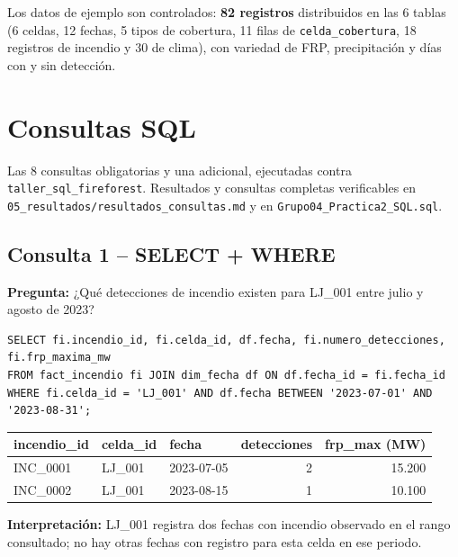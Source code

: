 \documentclass[11pt,a4paper]{article}
\begin{document}
Los datos de ejemplo son controlados: \textbf{82 registros} distribuidos en las 6 tablas (6
celdas, 12 fechas, 5 tipos de cobertura, 11 filas de \texttt{celda\_cobertura}, 18 registros de
incendio y 30 de clima), con variedad de FRP, precipitaci\'on y d\'ias con y sin detecci\'on.

\section{Consultas SQL}

Las 8 consultas obligatorias y una adicional, ejecutadas contra \texttt{taller\_sql\_fireforest}.
Resultados y consultas completas verificables en \texttt{05\_resultados/resultados\_consultas.md}
y en \texttt{Grupo04\_Practica2\_SQL.sql}.

\subsection*{Consulta 1 -- SELECT + WHERE}
\textbf{Pregunta:} ¿Qu\'e detecciones de incendio existen para LJ\_001 entre julio y agosto de
2023?
\begin{scriptsize}
\begin{verbatim}
SELECT fi.incendio_id, fi.celda_id, df.fecha, fi.numero_detecciones, fi.frp_maxima_mw
FROM fact_incendio fi JOIN dim_fecha df ON df.fecha_id = fi.fecha_id
WHERE fi.celda_id = 'LJ_001' AND df.fecha BETWEEN '2023-07-01' AND '2023-08-31';
\end{verbatim}
\end{scriptsize}
\vspace{-4pt}
\begin{center}\scriptsize
\begin{tabular}{@{}lllrr@{}}
\toprule
\textbf{incendio\_id} & \textbf{celda\_id} & \textbf{fecha} & \textbf{detecciones} & \textbf{frp\_max (MW)} \\
\midrule
INC\_0001 & LJ\_001 & 2023-07-05 & 2 & 15.200 \\
INC\_0002 & LJ\_001 & 2023-08-15 & 1 & 10.100 \\
\bottomrule
\end{tabular}
\end{center}
\vspace{-4pt}
\textbf{Interpretaci\'on:} LJ\_001 registra dos fechas con incendio observado en el rango
consultado; no hay otras fechas con registro para esta celda en ese periodo.
\end{document}
